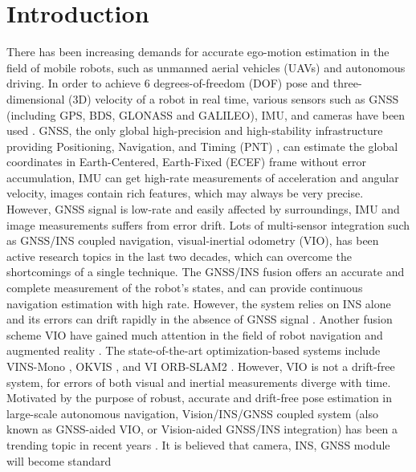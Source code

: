\documentclass[journal,article,submit,moreauthors,pdftex]{Definitions/mdpi}
\begin{document}

\section{Introduction}
There has been increasing demands for accurate  ego-motion estimation 
in the field of mobile robots, such as unmanned aerial vehicles 
(UAVs) and autonomous driving.
In order to achieve 6 degrees-of-freedom (DOF) pose and 
three-dimensional (3D) velocity of a robot in real time, various 
sensors such as GNSS (including GPS, BDS, GLONASS and 
GALILEO), IMU, and cameras have been used \cite{hongVisualInertialOdometryRobust2018}.  
GNSS, the only global high-precision and high-stability infrastructure 
providing Positioning, Navigation, and Timing (PNT) \cite{liuRolePathVision2020}, 
can estimate the global coordinates in Earth-Centered, Earth-Fixed (ECEF) 
frame without error accumulation, IMU can get high-rate measurements of 
acceleration and angular velocity, images contain rich features, which may 
always be very precise. 
However, GNSS signal is low-rate and easily affected by surroundings, 
IMU and image measurements suffers from error drift.
Lots of multi-sensor integration such as GNSS/INS coupled navigation, 
visual-inertial odometry (VIO), has been active research 
topics in the last two decades, which can overcome the shortcomings 
of a single technique. 
The GNSS/INS fusion offers an accurate and complete measurement 
of the robot’s states, and can provide continuous navigation estimation 
with high rate. 
However, the system relies on INS alone and its errors can drift rapidly 
in the absence of GNSS signal \cite{changGNSSINSLiDARSLAM2019a}.
Another fusion scheme VIO have gained much attention in the field of 
robot navigation and augmented reality \cite{xufumuAccurateInitialState2018}. 
The state-of-the-art optimization-based systems include VINS-Mono 
\cite{qinVINSMonoRobustVersatile2017}, OKVIS \cite{leuteneggerKeyframeBasedVisualInertialSLAM2013}, 
and VI ORB-SLAM2 \cite{mur-artalVisualInertialMonocularSLAM2017a}.
However, VIO is not a drift-free system, for errors of both visual 
and inertial measurements diverge with time.
Motivated by the purpose of robust, accurate and drift-free pose 
estimation in large-scale autonomous navigation, Vision/INS/GNSS 
coupled system (also known as GNSS-aided VIO, or Vision-aided GNSS/INS 
integration) has been a trending topic in recent years 
\cite{cioffiTightlycoupledFusionGlobal2020}. 
It is believed that camera, INS, GNSS module will become standard 
\end{document}
